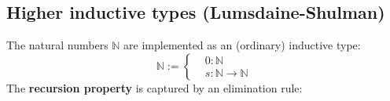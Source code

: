 \documentclass[11pt]{article}
\newcommand{\myemph}[1]{\textbf{#1}}    %
\begin{document}
%
%
%
%
%
%
%
%
%
%
\subsection*{Higher inductive types (Lumsdaine-Shulman)}

The natural numbers $\mathbb{N}$ are implemented as an (ordinary) inductive type:
\[
			\mathbb{N} := \begin{cases} &0 : \mathbb{N}\\
		 				&s : \mathbb{N} \rightarrow \mathbb{N}
						\end{cases}
\]
%
The \myemph{recursion property} is captured by an elimination rule:

\begin{prooftree}
\end{prooftree}
%
\end{document}
